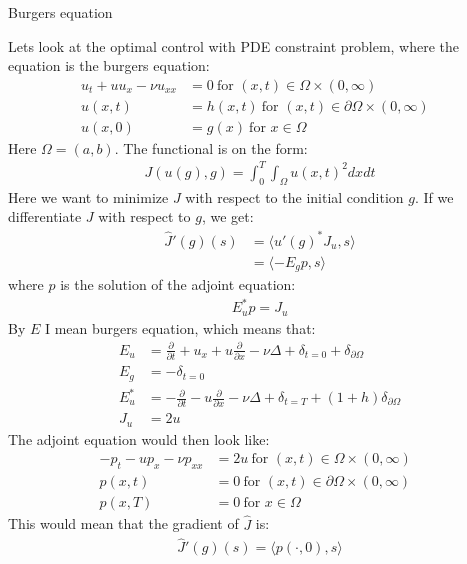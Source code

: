 \documentclass[11pt,a4paper]{report}
\begin{document}
\begin{center}

\LARGE Burgers equation


\end{center}
Lets look at the optimal control with PDE constraint problem, where the equation is the burgers equation:
\begin{align*}
u_t + uu_x - \nu u_{xx} &= 0 \ \text{for $(x,t)\in \Omega\times(0,\infty)$}\\
u(x,t) &= h(x,t) \ \text{for $(x,t) \in\partial\Omega\times(0,\infty)$ } \\
u(x,0) &= g(x) \ \text{for $x \in\Omega$ }
\end{align*} 
Here $\Omega = (a,b)$. The functional is on the form:
\begin{align*}
J(u(g),g) = \int_0^T\int_{\Omega} u(x,t)^2 dxdt
\end{align*}
Here we want to minimize $J$ with respect to the initial condition $g$. If we differentiate $J$ with respect to $g$, we get:
\begin{align*}
\hat{J}'(g)(s) &= \langle u'(g)^*J_u,s \rangle \\
&= \langle -E_gp,s \rangle
\end{align*}
where $p$ is the solution of the adjoint equation:
\begin{align*}
E_u^*p = J_u
\end{align*}
By $E$ I mean burgers equation, which means that:
\begin{align*}
E_u &= \frac{\partial}{\partial t} + u_x + u\frac{\partial}{\partial x} - \nu\Delta + \delta_{t=0} + \delta_{\partial \Omega} \\
E_g &= -\delta_{t=0} \\
E_u^* &= -\frac{\partial}{\partial t}  -u\frac{\partial}{\partial x}- \nu\Delta + \delta_{t=T} + (1+h)\delta_{\partial \Omega} \\
J_u &= 2u
\end{align*}
The adjoint equation would then look like:
\begin{align*}
-p_t -up_x - \nu p_{xx} &= 2u \ \text{for $(x,t)\in \Omega\times(0,\infty)$}\\
p(x,t) &= 0 \ \text{for $(x,t) \in\partial\Omega\times(0,\infty)$ } \\
p(x,T) &= 0 \ \text{for $x \in\Omega$ }
\end{align*}
This would mean that the gradient of $\hat{J}$ is:
\begin{align*}
\hat{J}'(g)(s) = \langle p(\cdot,0), s\rangle
\end{align*}
\end{document}
